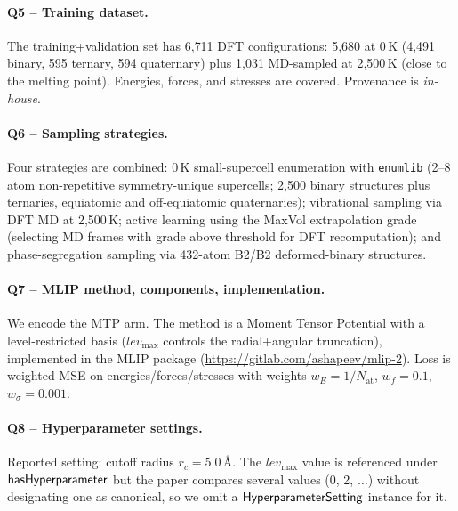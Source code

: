 \paragraph{Q5 -- Training dataset.}
The training+validation set has 6{,}711 DFT configurations: 5{,}680 at
0\,K (4{,}491 binary, 595 ternary, 594 quaternary) plus 1{,}031
MD-sampled at 2{,}500\,K (close to the melting point). Energies,
forces, and stresses are covered. Provenance is \emph{in-house}.


\paragraph{Q6 -- Sampling strategies.}
Four strategies are combined: 0\,K small-supercell enumeration with
\texttt{enumlib} (2--8 atom non-repetitive symmetry-unique supercells;
2{,}500 binary structures plus ternaries, equiatomic and off-equiatomic
quaternaries); vibrational sampling via DFT MD at 2{,}500\,K; active
learning using the MaxVol extrapolation grade (selecting MD frames
with grade above threshold for DFT recomputation); and
phase-segregation sampling via 432-atom B2/B2 deformed-binary
structures.


\paragraph{Q7 -- MLIP method, components, implementation.}
We encode the MTP arm. The method is a Moment Tensor Potential with a
level-restricted basis ($\mathit{lev}_{\max}$ controls the radial+angular
truncation), implemented in the MLIP package
(\url{https://gitlab.com/ashapeev/mlip-2}). Loss is weighted MSE on
energies/forces/stresses with weights
$w_E=1/N_{\text{at}}$, $w_f=0.1$, $w_\sigma=0.001$.


\paragraph{Q8 -- Hyperparameter settings.}
Reported setting: cutoff radius $r_c=5.0$\,\AA. The
$\mathit{lev}_{\max}$ value is referenced under
$\mathsf{hasHyperparameter}$ but the paper compares several values
(0, 2, $\dots$) without designating one as canonical, so we omit a
$\mathsf{HyperparameterSetting}$ instance for it.


